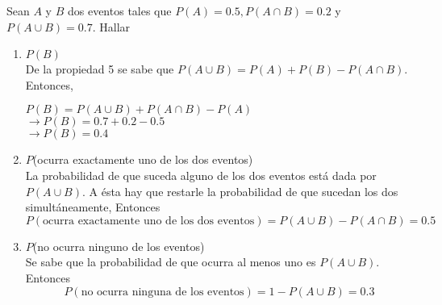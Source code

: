 \item Sean $A$ y $B$ dos eventos tales que $P(A)=0.5,P(A\cap B)=0.2$ y $P(A\cup B)=0.7$. Hallar
    \begin{enumerate}
        \item $P(B)$\e\\
            De la propiedad 5 se sabe que $P(A\cup B)=P(A)+P(B)-P(A\cap B)$. Entonces,\begin{center}
                $P(B)=P(A\cup B)+P(A\cap B)-P(A)$\\
                $\to P(B)=0.7+0.2-0.5$\\
                $\to P(B)=0.4$    
            \end{center}
        \item $P$(ocurra exactamente uno de los dos eventos)\e\\
            La probabilidad de que suceda alguno de los dos eventos está dada por $P(A\cup B)$. A ésta hay que restarle la probabilidad de que sucedan los dos simultáneamente, Entonces\[P(\text{ocurra exactamente uno de los dos eventos})=P(A\cup B)-P(A\cap B)=0.5\]
        \item $P$(no ocurra ninguno de los eventos)\e\\
            Se sabe que la probabilidad de que ocurra al menos uno es $P(A\cup B)$. Entonces\[P(\text{no ocurra ninguna de los eventos})=1-P(A\cup B)=0.3\]
    \end{enumerate}